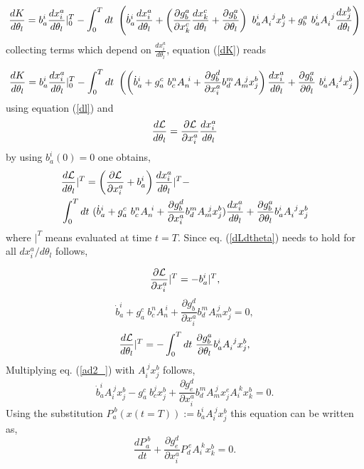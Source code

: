 \documentclass[12pt,a4paper]{article}
\begin{document}
\begin{equation}
\label{dK}
\frac{d K }{d\theta_l} = b^i_a \frac{d x^a_i}{d\theta_l} |^T_0 - \int^T_0 dt\ \left( \dot{b}^i_a \frac{d x^a_i}{d\theta_l} + \left(\frac{\partial g^a_b}{\partial x^c_k} \frac{d x^c_k}{d\theta_l} + \frac{\partial g^a_b}{\partial \theta_l} \right) \ b^i_a A_i^{\ j} x^b_j + g^a_b \ b^i_a A_i^{\ j} \frac{d x^b_j}{d\theta_l} \right)
\end{equation} collecting terms which depend on $\frac{d x^a_i}{d\theta_l}$, equation (\ref{dK}) reads

$$
\frac{d K }{d\theta_l} = b^i_a \frac{d x^a_i}{d\theta_l} |^T_0 - \int^T_0 dt\ \left(  \left( \dot{b}^i_a  + g^c_a \ b^n_c A_n^{\ i}  + \frac{\partial g^d_b}{\partial x^a_i} b^m_d A_m^{\ j} x^b_j \right) \frac{d x^a_i}{d\theta_l} + \frac{\partial g^a_b}{\partial \theta_l}  \ b^i_a A_i^{\ j} x^b_j \right)
$$ using equation (\ref{dl}) and 
$$
\frac{d\mathcal{L}}{d\theta_l} = \frac{\partial \mathcal{L}}{\partial x^a_i} \frac{d x^a_i}{d\theta_l} 
$$by using $b^i_a(0)= 0$ one obtains,
\begin{equation}
\label{dLdtheta}
\begin{aligned}
& \frac{d\mathcal{L}}{d\theta_l}|^{T} = \left(\frac{\partial \mathcal{L}}{\partial x^a_i}  + b^i_a  \right) \frac{d x^a_i}{d\theta_l} |^T - \\
&\int^T_0 dt\ (\dot{b}^i_a  + g^c_a \ b^n_c A_n^{\ i}  + \frac{\partial g^d_b}{\partial x^a_i} b^m_d A_m^{\ j} x^b_j) \frac{d x^a_i}{d\theta_l}+ \frac{\partial g^a_b}{\partial \theta_l} b^i_a A_i^{\ j} x^b_j
\end{aligned}
\end{equation} where $|^{T}$ means evaluated at time $t=T$. Since eq. (\ref{dLdtheta}) needs to hold for all ${d x^a_i}/{d\theta_l}$ follows,

\begin{equation}
\label{ad1_}
\frac{\partial \mathcal{L}}{\partial x^a_i} |^T= -  b^i_a  |^T,
\end{equation}
\begin{equation}
\label{ad2_}
\dot{b}^i_a  + g^c_a \ b^n_c A_n^{\ i}  + \frac{\partial g^d_b}{\partial x^a_i} b^m_d A_m^{\ j} x^b_j=0, 
\end{equation}
\begin{equation}
	\label{ad3_}
	\frac{d\mathcal{L}}{d\theta_l}|^{T}  = - \int^T_0 dt\ \frac{\partial g^a_b}{\partial \theta_l} b^i_a A_i^{\ j} x^b_j, 
\end{equation}
Multiplying eq. (\ref{ad2_}) with $A_i^{\ j} x^b_j$
follows, $$\dot{b}^i_a A_i^{\ j} x^b_j - g^c_a \ b^j_c  x^b_j  + \frac{\partial g^d_e}{\partial x^a_i} b^m_d A_m^{\ j} x^e_j A_i^{\ k} x^b_k=0.$$
Using the substitution $P^{\ b}_a(x(t=T)) := b^i_a A_i^{\ j} x^b_j$
this equation can be written as, 
$$
\frac{d P^{\ b}_a}{dt} +  \frac{\partial g^d_e}{\partial x^a_i}P^{\ e}_d A_i^{\ k} x^b_k=0.
$$
\end{document}
